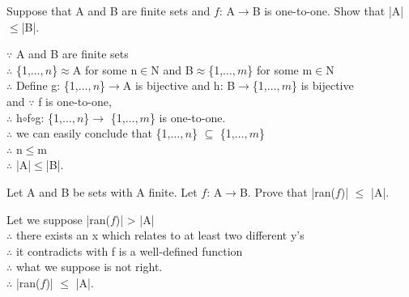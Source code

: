 \documentclass[11pt, a4paper, UTF8]{ctexart}
\begin{document}
\begin{problem}[UD:21.17]
Suppose that A and B are finite sets and $f$: A$\rightarrow$B is one-to-one. Show that |A|$\le$|B|.
\end{problem}
\begin{solution}
$\because$ A and B are finite sets\\
$\therefore$ \{1,$\dots,n$\}$\approx$A for some n$\in$N and B$\approx$\{1,$\dots,m$\} for some m$\in$N\\
$\therefore$ Define g: \{1,$\dots,n$\}$\rightarrow$A is bijective and h: B$\rightarrow$\{1,$\dots,m$\} is bijective\\
and $\because$ f is one-to-one,\\
$\therefore$ h$\circ$f$\circ$g: \{1,$\dots,n$\}$\rightarrow$ \{1,$\dots,m$\} is one-to-one.\\
$\therefore$ we can easily conclude that \{1,$\dots,n$\} $\subseteq$ \{1,$\dots,m$\}\\
$\therefore$ n$\le$m\\
$\therefore$ |A|$\le$|B|.\\
\end{solution}



\begin{problem}[UD:21.18]
Let A and B be sets with A finite. Let $f$: A$\rightarrow$B. Prove that |ran($f$)| $\le$ |A|.
\end{problem}
\begin{solution}
Let we suppose |ran($f$)| > |A|\\
$\therefore$ there exists an x which relates to at least two different y's\\
$\therefore$ it contradicts with f is a well-defined function\\
$\therefore$ what we suppose is not right.\\
$\therefore$ |ran($f$)| $\le$ |A|.
\end{solution}
\end{document}
